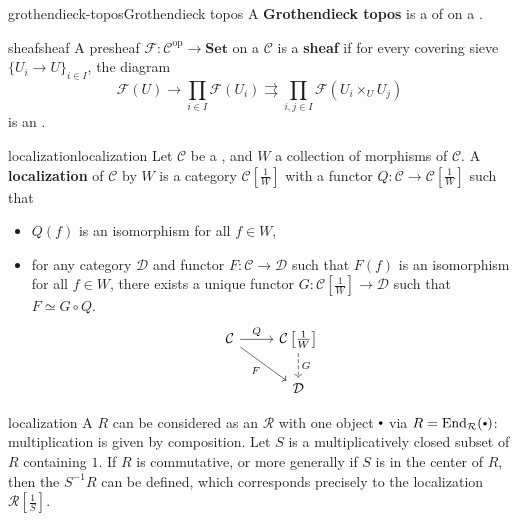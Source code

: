 \begin{topic}{grothendieck-topos}{Grothendieck topos}
    A \textbf{Grothendieck topos} is a  of  on a .
\end{topic}

\begin{topic}{sheaf}{sheaf}
    A presheaf $\mathcal{F} : \mathcal{C}^\text{op} \to \textbf{Set}$ on a  $\mathcal{C}$ is a \textbf{sheaf} if for every covering sieve $\{ U_i \to U \}_{i \in I}$, the diagram
    \[ \mathcal{F}(U) \to \prod_{i \in I} \mathcal{F}(U_i) \rightrightarrows \prod_{i, j \in I} \mathcal{F}(U_i \times_U U_j) \]
    is an .
\end{topic}

\begin{topic}{localization}{localization}
    Let $\mathcal{C}$ be a , and $W$ a collection of morphisms of $\mathcal{C}$. A \textbf{localization} of $\mathcal{C}$ by $W$ is a category $\mathcal{C}\left[\frac{1}{W}\right]$ with a functor $Q : \mathcal{C} \to \mathcal{C}\left[\frac{1}{W}\right]$ such that
    \begin{itemize}
        \item $Q(f)$ is an isomorphism for all $f \in W$,
        \item for any category $\mathcal{D}$ and functor $F : \mathcal{C} \to \mathcal{D}$ such that $F(f)$ is an isomorphism for all $f \in W$, there exists a unique functor $G : \mathcal{C}\left[\frac{1}{W}\right] \to \mathcal{D}$ such that $F \simeq G \circ Q$.
        \[ \begin{tikzcd} \mathcal{C} \arrow{r}{Q} \arrow[swap]{rd}{F} & \mathcal{C}\left[\frac{1}{W}\right] \arrow[dashed]{d}{G} \\ & \mathcal{D} \end{tikzcd} \]
    \end{itemize}
\end{topic}

\begin{example}{localization}
    A  $R$ can be considered as an  $\mathcal{R}$ with one object $\bdot$ via $R = \text{End}_\mathcal{R}(\bdot)$: multiplication is given by composition. Let $S$ is a multiplicatively closed subset of $R$ containing $1$. If $R$ is commutative, or more generally if $S$ is in the center of $R$, then the  $S^{-1} R$ can be defined, which corresponds precisely to the localization $\mathcal{R}\left[\frac{1}{S}\right]$.
\end{example}

